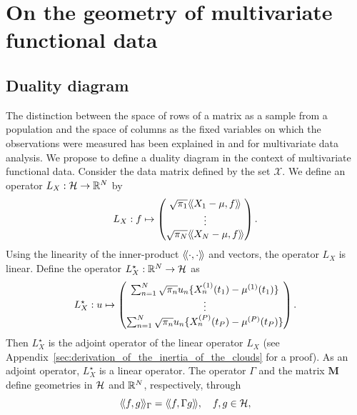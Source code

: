 \section{On the geometry of multivariate functional data} %
\label{sec:geometric_point_of_view_mfpca}

\subsection{Duality diagram} %
\label{sub:duality_diagram}

The distinction between the space of rows of a matrix as a sample from a population and the space of columns as the fixed variables on which the observations were measured has been explained in \cite{holmesMultivariateDataAnalysis2008} and \cite{delacruzDualityDiagramData2011} for multivariate data analysis. We propose to define a duality diagram in the context of multivariate functional data. Consider the data matrix defined by the set $\mathcal{X}$. We define an operator $L_X : \mathcal{H} \rightarrow \mathbb{R}^N$ by
\begin{equation}
    L_X: f \mapsto \begin{pmatrix}
        \sqrt{\pi_1}\inH{X_1 - \mu}{f} \\
        \vdots \\
        \sqrt{\pi_N}\inH{X_N - \mu}{f}
    \end{pmatrix}.
\end{equation}
Using the linearity of the inner-product $\langle\!\langle\cdot, \cdot\rangle\!\rangle$ and vectors, the operator $L_X$ is linear. Define the operator $L^\star_X : \mathbb{R}^N \rightarrow \mathcal{H}$ as
\begin{equation}
    L^\star_X: u \mapsto \begin{pmatrix}
       \sum_{n = 1}^N \sqrt{\pi_n} u_n \{X_n^{(1)}(t_1) - \mup{1}(t_1)\} \\ 
       \vdots \\ 
       \sum_{n = 1}^N \sqrt{\pi_n} u_n \{X_n^{(P)}(t_P) - \mup{P}(t_P)\}
    \end{pmatrix}.
\end{equation}
Then $L^\star_X$ is the adjoint operator of the linear operator $L_X$ (see Appendix~\ref{sec:derivation_of_the_inertia_of_the_clouds} for a proof). As an adjoint operator, $L^\star_X$ is a linear operator. The operator $\Gamma$ and the matrix $\mathbf{M}$ define geometries in $\mathcal{H}$ and $\mathbb{R}^N$, respectively, through
\begin{equation}
\inHG{f}{g} = \inH{f}{\Gamma g},\quad f, g \in \HH,
\end{equation}
